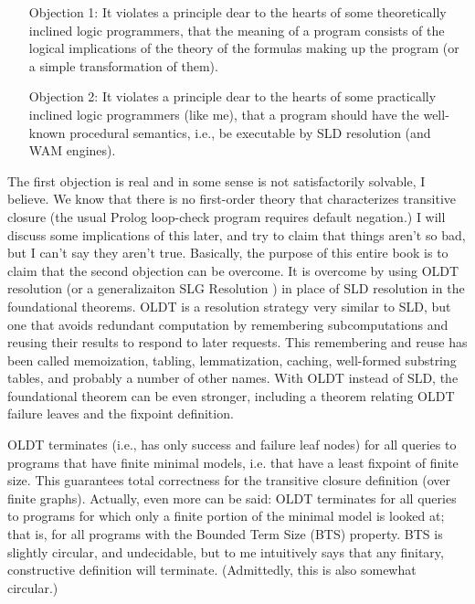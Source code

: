 \begin{itemize}
\item[Objection 1:] 
It violates a principle dear to the hearts of some theoretically
inclined logic programmers, that the meaning of a program consists of
the logical implications of the theory of the formulas making up the
program (or a simple transformation of them).

\item[Objection 2:]
It violates a principle dear to the hearts of some practically
inclined logic programmers (like me), that a program should have the
well-known procedural semantics, i.e., be executable by SLD resolution
(and WAM engines).

\end{itemize} 

The first objection is real and in some sense is not satisfactorily
solvable, I believe.  We know that there is no first-order theory that
characterizes transitive closure (the usual Prolog loop-check program
requires default negation.)  I will discuss some implications of this
later, and try to claim that things aren't so bad, but I can't say
they aren't true.  Basically, the purpose of this entire book is to
claim that the second objection can be overcome.  It is overcome by
using OLDT resolution \cite{} (or a generalizaiton SLG Resolution \cite{})
in place of SLD resolution in the foundational
theorems.  OLDT is a resolution strategy very similar to SLD, but one
that avoids redundant computation by remembering subcomputations and
reusing their results to respond to later requests.  This remembering
and reuse has been called memoization, tabling, lemmatization,
caching, well-formed substring tables, and probably a number of other
names.  With OLDT instead of SLD, the foundational theorem can be even
stronger, including a theorem relating OLDT failure leaves and the
fixpoint definition.

OLDT terminates (i.e., has only success and failure leaf nodes) for
all queries to programs that have finite minimal models, i.e. that
have a least fixpoint of finite size.  This guarantees total
correctness for the transitive closure definition (over finite
graphs).  Actually, even more can be said: OLDT terminates for all
queries to programs for which only a finite portion of the minimal
model is looked at; that is, for all programs with the Bounded Term
Size (BTS) property.  BTS is slightly circular, and undecidable, but
to me intuitively says that any finitary, constructive definition will
terminate.  (Admittedly, this is also somewhat circular.)

